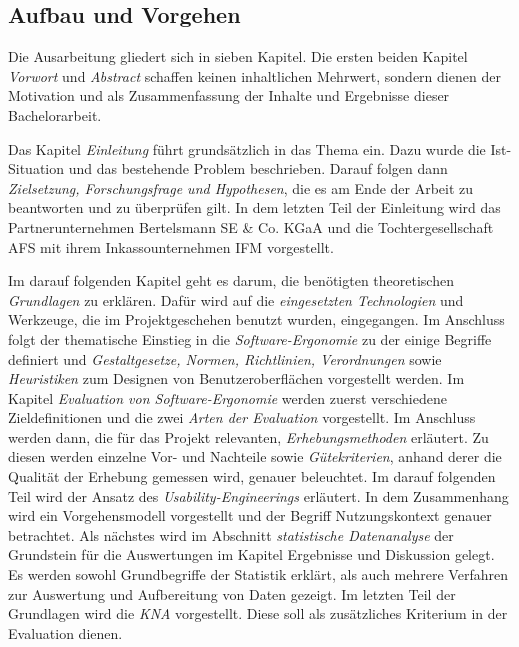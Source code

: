 
\subsection{Aufbau und Vorgehen}
Die Ausarbeitung gliedert sich in sieben Kapitel. Die ersten beiden Kapitel \textit{Vorwort} und \textit{Abstract} schaffen keinen inhaltlichen Mehrwert, sondern dienen der Motivation und als Zusammenfassung der Inhalte und Ergebnisse dieser Bachelorarbeit.

Das Kapitel \textit{Einleitung} führt grundsätzlich in das Thema ein. Dazu wurde die Ist-Situation und das bestehende Problem beschrieben. Darauf folgen dann \textit{Zielsetzung, Forschungsfrage und Hypothesen}, die es am Ende der Arbeit zu beantworten und zu überprüfen gilt. In dem letzten Teil der Einleitung wird das Partnerunternehmen Bertelsmann SE \& Co. KGaA und die Tochtergesellschaft \gls{AFS} mit ihrem Inkassounternehmen \gls{IFM} vorgestellt.

Im darauf folgenden Kapitel geht es darum, die benötigten theoretischen \textit{Grundlagen} zu erklären. Dafür wird auf die \textit{eingesetzten Technologien} und Werkzeuge, die im Projektgeschehen benutzt wurden, eingegangen. Im Anschluss folgt der thematische Einstieg in die \textit{Software-Ergonomie} zu der einige Begriffe definiert und \textit{Gestaltgesetze, Normen, Richtlinien, Verordnungen} sowie \textit{Heuristiken} zum Designen von Benutzeroberflächen vorgestellt werden. Im Kapitel \textit{Evaluation von Software-Ergonomie} werden zuerst verschiedene Zieldefinitionen und die zwei \textit{Arten der Evaluation} vorgestellt. Im Anschluss werden dann, die für das Projekt relevanten, \textit{Erhebungsmethoden} erläutert. Zu diesen werden einzelne Vor- und Nachteile sowie \textit{Gütekriterien}, anhand derer die Qualität der Erhebung gemessen wird, genauer beleuchtet. Im darauf folgenden Teil wird der Ansatz des \textit{Usability-Engineerings} erläutert. In dem Zusammenhang wird ein Vorgehensmodell vorgestellt und der Begriff Nutzungskontext genauer betrachtet. Als nächstes wird im Abschnitt \textit{statistische Datenanalyse} der Grundstein für die Auswertungen im Kapitel Ergebnisse und Diskussion gelegt. Es werden sowohl Grundbegriffe der Statistik erklärt, als auch mehrere Verfahren zur Auswertung und Aufbereitung von Daten gezeigt. Im letzten Teil der Grundlagen wird die \textit{\gls{KNA}} vorgestellt. Diese soll als zusätzliches Kriterium in der Evaluation dienen.

